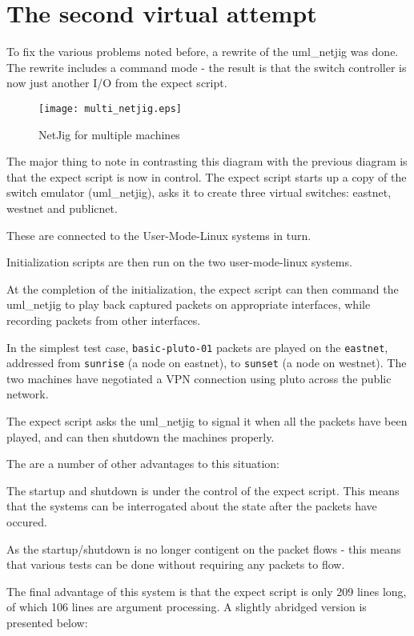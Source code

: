 \section{The second virtual attempt}

To fix the various problems noted before, a rewrite of the uml\_netjig was
done. The rewrite includes a command mode - the result is that the switch
controller is now just another I/O from the expect script.

\begin{figure}[ht]
\texttt{[image: multi\_netjig.eps]} 
\caption{NetJig for multiple machines}
\label{netjig2}
\end{figure}

The major thing to note in contrasting this diagram with the previous
diagram is that the expect script is now in control. The expect
script starts up a copy of the switch emulator (uml\_netjig), asks it to
create three virtual switches: eastnet, westnet and publicnet. 

These are connected to the User-Mode-Linux systems in turn. 

Initialization scripts are then run on the two user-mode-linux systems.

At the completion of the initialization, the expect script can then
command the uml\_netjig to play back captured packets on appropriate
interfaces, while recording packets from other interfaces.

In the simplest test case, {\tt basic-pluto-01} packets are played 
on the {\tt eastnet}, addressed from {\tt sunrise} (a node on eastnet),
to {\tt sunset} (a node on westnet). The two machines have negotiated 
a VPN connection using pluto across the public network. 

The expect script asks the uml\_netjig to signal it when all the packets 
have been played, and can then shutdown the machines properly.

The are a number of other advantages to this situation:

The startup and shutdown is under the control of the expect script. 
This means that the systems can be interrogated about the state after the
packets have occured.

As the startup/shutdown is no longer contigent on the packet flows - this
means that various tests can be done without requiring any packets to flow.

The final advantage of this system is that the expect script is only 209
lines long, of which 106 lines are argument processing. A slightly
abridged version is presented below:

